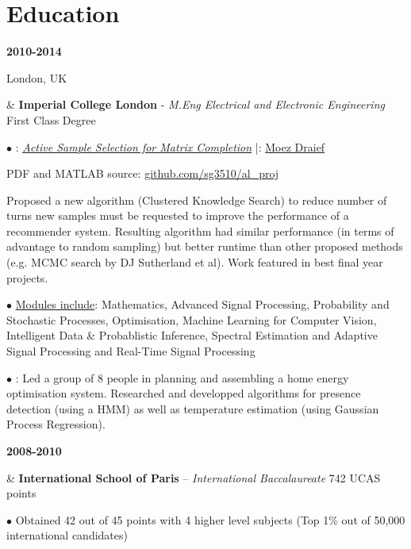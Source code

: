 \documentclass[a4paper,10pt,oneside]{article}
\begin{document}
\section*{Education}
\begin{body}

{\textbf{2010-2014} \par London, UK} & \textbf{Imperial College London} - \textit{M.Eng Electrical and Electronic Engineering} \hfill First Class Degree 



$\bullet$ \underline{}: \href{http://sg3510.github.io/al_proj/Report/thesis.pdf}{\textit{Active Sample Selection for Matrix Completion}} \hfill|\hfill  \underline{}: \href{http://www.iis.ee.ic.ac.uk/m.draief}{Moez Draief}

PDF and MATLAB source: \href{https://github.com/sg3510/al_proj}{github.com/sg3510/al\_proj}

Proposed a new algorithm (Clustered Knowledge Search) to reduce number of turns new samples must be requested to improve the performance of a recommender system. Resulting algorithm had similar performance (in terms of advantage to random sampling) but better runtime than other proposed methods (e.g. MCMC search by DJ Sutherland et al). Work featured in best final year projects.

$\bullet$ \underline{Modules include}: Mathematics, Advanced Signal Processing, Probability and Stochastic Processes, Optimisation, Machine Learning for Computer Vision, Intelligent Data \& Probablistic Inference, Spectral Estimation and Adaptive Signal Processing and Real-Time Signal Processing



$\bullet$ \underline{}: Led a group of 8 people in planning and assembling a home energy optimisation system. Researched and developped algorithms for presence detection (using a HMM) as well as temperature estimation (using Gaussian Process Regression).
\\ 
{\textbf{2008-2010} \par {} } & \textbf{International School of Paris} – \textit{International Baccalaureate} \hfill 742 UCAS points

$\bullet$ Obtained 42 out of 45 points with 4 higher level subjects (Top 1\% out of 50,000 international candidates)

\end{body}
\end{document}
